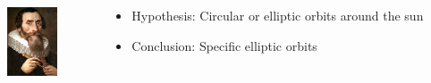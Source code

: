\documentclass{beamer}
\begin{document}
\begin{frame}
\begin{columns}
\begin{column}{0.5\textwidth}
{      }
    \end{column}
  \end{columns}
  \begin{columns}
    \begin{column}{0.1\textwidth}
      \includegraphics[width=4em]{figures/Johannes-Kepler.jpg}
    \end{column}
    \begin{column}{0.9\textwidth}
      \begin{itemize}
      \item<3-> Hypothesis: Circular \alert{or} elliptic orbits around the \alert{sun}
      \item<4-> Conclusion: Specific \alert{elliptic} orbits
      \end{itemize}
    \end{column}
  \end{columns}
\end{frame}
\end{document}
